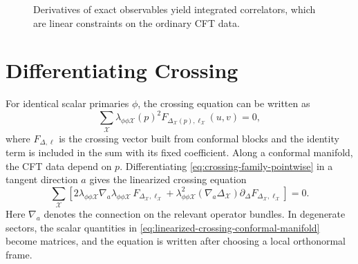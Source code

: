 \begin{figure}[H]
  \centering
  \caption{Derivatives of exact observables yield integrated correlators,
  which are linear constraints on the ordinary CFT data.}
  \label{fig:integrated-correlator-functional}
\end{figure}

\section{Differentiating Crossing}

For identical scalar primaries \(\phi\), the crossing equation can be written
as
\begin{equation}
  \sum_{\mathcal X}
  \lambda_{\phi\phi\mathcal X}(p)^2
  F_{\Delta_{\mathcal X}(p),\ell_{\mathcal X}}(u,v)=0,
  \label{eq:crossing-family-pointwise}
\end{equation}
where \(F_{\Delta,\ell}\) is the crossing vector built from conformal blocks
and the identity term is included in the sum with its fixed coefficient.
Along a conformal manifold, the CFT data depend on \(p\).  Differentiating
\eqref{eq:crossing-family-pointwise} in a tangent direction \(a\) gives the
linearized crossing equation
\begin{equation}
  \sum_{\mathcal X}
  \left[
    2\lambda_{\phi\phi\mathcal X}
      \nabla_a\lambda_{\phi\phi\mathcal X}\,
      F_{\Delta_{\mathcal X},\ell_{\mathcal X}}
    +
    \lambda_{\phi\phi\mathcal X}^2
      (\nabla_a\Delta_{\mathcal X})
      \partial_\Delta F_{\Delta_{\mathcal X},\ell_{\mathcal X}}
  \right]
  =
  0.
  \label{eq:linearized-crossing-conformal-manifold}
\end{equation}
Here \(\nabla_a\) denotes the connection on the relevant operator bundles.  In
degenerate sectors, the scalar quantities in
\eqref{eq:linearized-crossing-conformal-manifold} become matrices, and the
equation is written after choosing a local orthonormal frame.

